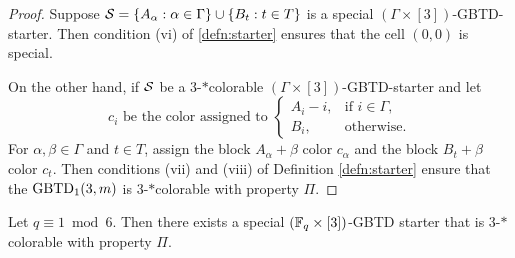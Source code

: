 \documentclass[draft, 11pt]{article}
\begin{document}
\begin{proof}
Suppose $\mathcal S =\{A_\alpha:
 \alpha\in\Gamma\} \cup \{B_t: t\in T\}$
  is a special $(\Gamma\times[3])$-GBTD-starter.
 Then condition (vi) of \ref{defn:starter} ensures that the cell $(0,0)$ is special.
 
 On the other hand, if $\mathcal S$ be a $3$-$*$colorable $(\Gamma\times[3])$-GBTD-starter and let
 \begin{equation*}
 c_i \mbox{ be the color assigned to }
 \begin{cases}
 A_i-i,  & \mbox{if } i\in\Gamma,\\
 B_i,        & \mbox{otherwise.}
 \end{cases}
 \end{equation*}
 For $\alpha,\beta\in \Gamma$ and $t\in T$, assign the block $A_\alpha+\beta$ color $c_\alpha$ and the block $B_t+\beta$ color $c_t$.
 Then conditions (vii) and (viii) of Definition \ref{defn:starter} ensure that the ${\rm GBTD}_1(3,m)$ is $3$-$*$colorable with property $\Pi$.
 \end{proof}
 


\begin{proposition}\label{prop:fqstarterforGBTD(3,m)} Let $q\equiv 1\bmod 6$. Then there exists a special $(\mathbb F_q\times[3])$-GBTD starter
that is $3$-$*$colorable with property $\Pi$.
\end{proposition}
\end{document}
